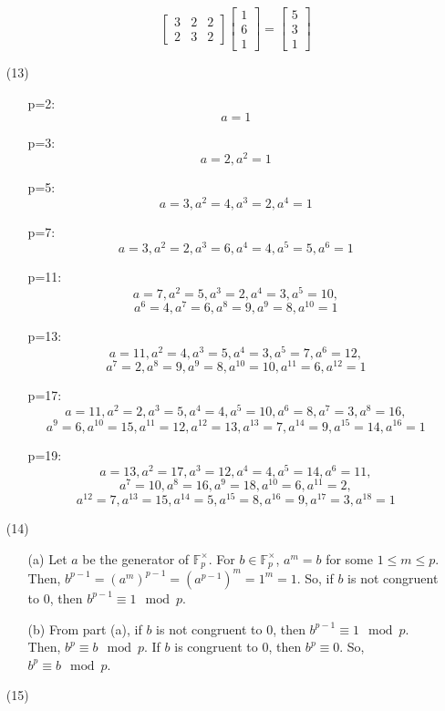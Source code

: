 \documentclass[12pt]{article}
\begin{document}
\begin{itemize}
\begin{itemize}
$$\begin{bmatrix}
3 & 2 & 2 \\
2 & 3 & 2
\end{bmatrix}\begin{bmatrix}
1 \\
6 \\
1
\end{bmatrix} = \begin{bmatrix}
5 \\
3 \\
1
\end{bmatrix}$$
\end{itemize}
\item[(13)]
\begin{itemize}
\item[p=2:]
$$a = 1$$
\item[p=3:]
$$a = 2, a^2 = 1$$
\item[p=5:]
$$a = 3, a^2 = 4, a^3 = 2, a^4 = 1$$
\item[p=7:]
$$a = 3, a^2 = 2, a^3 = 6, a^4 = 4, a^5 = 5, a^6 = 1$$
\item[p=11:]
$$a = 7, a^2 = 5, a^3 = 2, a^4 = 3, a^5 = 10,$$
$$a^6 = 4, a^7 = 6, a^8 = 9, a^9 = 8, a^{10} = 1$$
\item[p=13:]
$$a = 11, a^2 = 4, a^3 = 5, a^4 = 3, a^5 = 7, a^6 = 12,$$
$$a^7 = 2, a^8 = 9, a^9 = 8, a^{10} = 10, a^{11} = 6, a^{12} = 1$$
\item[p=17:]
$$a = 11, a^2 = 2, a^3 = 5, a^4 = 4, a^5 = 10, a^6 = 8, a^7 = 3, a^8 = 16,$$
$$a^9 = 6, a^{10} = 15, a^{11} = 12, a^{12} = 13, a^{13} = 7, a^{14} = 9, a^{15} = 14, a^{16}= 1$$
\item[p=19:]
$$a = 13, a^2 = 17, a^3 = 12, a^4 = 4, a^5 = 14, a^6 = 11,$$
$$a^7 = 10, a^8 = 16, a^9 = 18, a^{10} = 6, a^{11} = 2,$$
$$a^{12} = 7, a^{13} = 15, a^{14} = 5, a^{15} = 8, a^{16} = 9, a^{17} = 3, a^{18} = 1$$
\end{itemize}
\item[(14)]
\begin{itemize}
\item[(a)]
Let $a$ be the generator of $\mathbb{F}_p^\times$. For $b \in \mathbb{F}_p^\times$, $a^m = b$ for some $1 \leq m \leq p$. Then, $b^{p - 1} = (a^m)^{p - 1} = (a^{p-1})^m = 1^m = 1$. So, if $b$ is not congruent to 0, then $b^{p - 1} \equiv 1 \mod p$.
\item[(b)]
From part (a), if $b$ is not congruent to 0, then $b^{p - 1} \equiv 1 \mod p$. Then, $b^p \equiv b \mod p$. If $b$ is congruent to 0, then $b^p \equiv 0$. So, $b^p \equiv b \mod p$.
\end{itemize}
\item[(15)]

\end{itemize}
\end{document}
